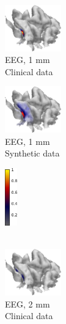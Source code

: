 \documentclass[5p]{elsarticle}
\begin{document}
\begin{figure}[h!]
\begin{footnotesize}
\begin{center}
\begin{minipage}{3cm} \begin{center}
\includegraphics[height=2.0cm]{CM_EEG_IG_1mm.png} \\ EEG, 1 mm \\ Clinical data
\end{center}\end{minipage}
\begin{minipage}{3cm} \begin{center}
\includegraphics[height=2.0cm]{CM_EEG_IG_1mm_syntheticdata.png} \\ EEG, 1 mm \\ Synthetic data
\end{center}\end{minipage} \begin{minipage}{0.5cm} \begin{center}
\includegraphics[height=2.5cm]{colorbar.png} \\ \mbox{} \\ \mbox{}
\end{center}
\end{minipage} \vskip0.2cm
\begin{minipage}{3cm} \begin{center}
\includegraphics[height=2.0cm]{CM_EEG_IG_2mm.png}\\ EEG, 2 mm \\ Clinical data

\end{center}
\end{minipage}
\end{center}
\end{footnotesize}
\end{figure}
\end{document}
